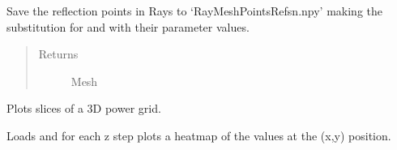 \documentclass[letterpaper,10pt,english]{sphinxmanual}
\begin{document}
\begin{fulllineitems}
Save the reflection points in Rays to   ‘RayMeshPointsRefsn.npy’ making the   substitution for  and  with their parameter values.
\begin{quote}\begin{description}
\item[{Returns}] \leavevmode
Mesh

\end{description}\end{quote}

\end{fulllineitems}


\begin{fulllineitems}
\label{\detokenize{index:RayTracerMainProgram.plot_grid}}
Plots slices of a 3D power grid.

Loads  and for each z step plots a heatmap of the   values at the (x,y) position.

\end{fulllineitems}

\end{document}
